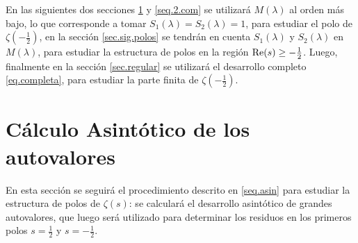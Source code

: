 En las siguientes dos secciones \ref{seq.2.asin} y \ref{seq.2.com} se utilizará $M ( \lambda )$ al orden más bajo, lo que corresponde a tomar $S _1 (\lambda) = S _2 ( \lambda )= 1$, para estudiar el polo de $\zeta \left( - \frac{1}{2} \right)$, en la sección \ref{sec.sig.polos} se tendrán en cuenta $S _1 (\lambda)$ y $S _2 ( \lambda )$ en $M ( \lambda)$, para estudiar la estructura de polos en la región ${\rm Re }(s) \geq - \frac{1}{2}$.
Luego, finalmente en la sección \ref{sec.regular} se utilizará el desarrollo completo \eqref{eq.completa}, para estudiar la parte finita de $\zeta \left( - \frac{1}{2} \right)$.

\section{Cálculo Asintótico de los autovalores}\label{seq.2.asin}

En esta sección se seguirá el procedimiento descrito en \ref{seq.asin} para estudiar la estructura de polos de $\zeta (s)$: se calculará el desarrollo asintótico de grandes autovalores, que luego será utilizado para determinar los residuos en los primeros polos $s= \frac{1}{2}$ y $s= - \frac{1}{2}$.



